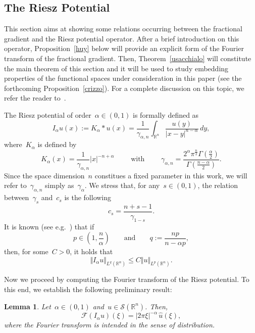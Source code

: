 \documentclass[11pt,hyp,]{nyjm}
\numberwithin{equation}{section}
\newcommand{\R}{\mathbb{R}}
\newtheorem{lemma}[theorem]{Lemma}
\theoremstyle{remark}
\newcommand{\Int}{\int_{\mathbb{R}^n}}
\renewcommand{\leq}{\leqslant}
\begin{document}
			
\subsection{The Riesz Potential}\label{rieszsec}
			This section aims at showing some relations occurring between the fractional gradient and the Riesz potential operator. After a brief introduction on this operator, Proposition~\ref{huy} below will provide an explicit form of the Fourier transform of the fractional gradient. Then, Theorem~\ref{usacchialo} will constitute the main theorem of this section and it will be used to study embedding properties of the functional spaces under consideration in this paper (see the forthcoming
Proposition~\ref{crizzo}). For a complete discussion on this topic, we refer the reader to~\cite{stein, hedberg, gravakos}. 
			
The Riesz potential of order~$\alpha \in (0,1)$ is formally defined as
			\begin{equation}\label{riesz}
				I_{\alpha}u (x) := K_{\alpha} \ast u (x) = \frac{1}{\gamma_{\alpha,n}}\Int \frac{u(y)}{|x-y|^{n-\alpha}} \, dy,   
			\end{equation}
			where~$K_{\alpha}$ is defined by 
	\begin{equation}\label{defgamma09}
			K_{\alpha}(x)= \frac{1}{\gamma_{\alpha,n}} |x|^{-n+\alpha}
		\qquad {\mbox{ with }}	\qquad
				\gamma_{\alpha,n}= \frac{2^{\alpha} \pi^{\frac{n}{2}} \Gamma(\frac{\alpha}{2})}{\Gamma(\frac{n-\alpha}{2})}.    \end{equation}
							Since the space dimension~$n$ constitues a fixed parameter in this work, we will refer to~$\gamma_{\alpha,n}$ simply as~$\gamma_{\alpha}$. We stress that, for any~$s \in (0,1)$, the relation between~$\gamma_{s}$ and~$c_s$ is the following
			\begin{equation}\label{relation}
				c_s= \frac{n+s-1}{\gamma_{1-s}}.
			\end{equation}
It is known (see e.g.~\cite[I, Theorem~1]{stein}) that if
$$ p \in \left(1,\frac{ n}{\alpha}\right)\qquad {\mbox{and}}\qquad
q:=\frac{np}{n-\alpha p},
$$ 		
then, for some~$C>0$, it holds that
\begin{equation}\label{riz}
\Vert I_{\alpha}u \Vert_{L^q(\R^n)} \leq C \Vert u \Vert_{L^p(\R^n)}.
\end{equation}

Now we proceed by computing the Fourier transform of the Riesz potential.
To this end, we establish the following preliminary result:

			\begin{lemma}\label{fr}
				Let~$\alpha \in (0,1)$ and~$u \in \mathcal{S}(\R^n)$. Then,
				\[
				\mathcal{F}(I_{\alpha}u) (\xi) = |2 \pi \xi|^{-\alpha}\, \widehat{u}(\xi),
				\]
				where the Fourier transform is intended in the sense of distribution.
			\end{lemma}
			
\end{document}
